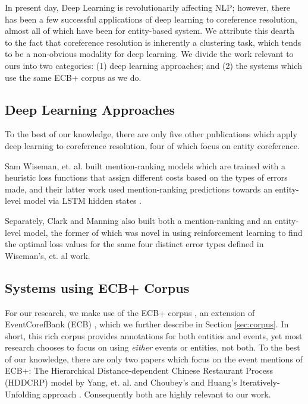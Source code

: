 \documentclass[11pt,a4paper]{article}
\begin{document}
In present day, Deep Learning is revolutionarily affecting NLP; however, there has been a few successful applications of deep learning to coreference resolution, almost all of which have been for entity-based system.  We attribute this dearth to the fact that coreference resolution is inherently a clustering task, which tends to be a non-obvious modality for deep learning.  We divide the work relevant to ours into two categories: (1) deep learning approaches; and (2) the systems which use the same ECB+ corpus \cite{ECB+} as we do.

\subsection{Deep Learning Approaches}
To the best of our knowledge, there are only five other publications which apply deep learning to coreference resolution, four of which focus on entity coreference.

Sam Wiseman, et. al. built mention-ranking models  which are trained with a heuristic loss functions that assign different costs based on the types of errors made, and their latter work used mention-ranking predictions towards an entity-level model via LSTM hidden states \cite{Hochreiter:1997:LSM:1246443.1246450}.

Separately, Clark and Manning  also built both a mention-ranking and an entity-level model, the former of which was novel in using reinforcement learning to find the optimal loss values for the same four distinct error types defined in Wiseman's, et. al  work.

\subsection{Systems using ECB+ Corpus}
For our research, we make use of the ECB+ corpus \cite{ECB+}, an extension of EventCorefBank (ECB) \cite{Bejan:2010:UEC:1858681.1858824}, which we further describe in Section \ref{sec:corpus}.  In short, this rich corpus provides annotations for both entities and events, yet most research chooses to focus on using \textit{either} events or entities, not both.  To the best of our knowledge, there are only two papers which focus on the event mentions of ECB+: The Hierarchical Distance-dependent Chinese Restaurant Process (HDDCRP) model by Yang, et. al.  and Choubey's and Huang's Iteratively-Unfolding approach .   Consequently both are highly relevant to our work.
\end{document}
